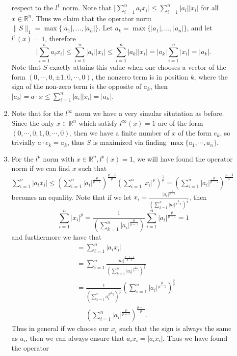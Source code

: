 \documentclass[12pt, letterpaper]{article}
\newcommand{\R}{\mathbb{R}}
\begin{document}
\begin{enumerate}
\begin{enumerate}
		respect to the $l^1$ norm.  Note that 
		$\lvert \sum_{i=1}^n a_i x_i \rvert \leq 
		\sum_{i=1}^n |a_i| |x_i|$ for all $x \in \R^n$.  
		Thus we claim that the operator norm $\|S \|_1 = 
		\max\{|a_1|,\ldots,|a_n| \}$.  Let $a_k = \max\{|a_1|,\ldots,|a_n| \}$, and let $l^1(x) = 1$, therefore 
		$$
		\lvert \sum_{i=1}^n a_i x_i \rvert 
		\leq \sum_{i=1}^n |a_i||x_i| 
		\leq \sum_{i=1}^n |a_k||x_i|
		= |a_k| \sum_{i=1}^n |x_i| = |a_k|.
		$$
		Note that $S$ exactly attains this value when one chooses a vector of the form 
		$(0,\cdots,0,\pm 1,0,\cdots,0)$, the nonzero term is in position     $k$, where the sign of the non-zero term is the 
		opposite of $a_k$, then 
		$|a_k| = a \cdot x \leq  \sum_{i=1}^n |a_i||x_i| = |a_k|$.  
		\item Note that for the $l^\infty$ norm we have a 
		very simular situtation as before.  Since the only 
		$x \in \R^n$ which satisfy $l^\infty(x) = 1$ are of the form 
		$(0,\cdots,0,1,0,\cdots,0)$, then we have a finite number 
		of $x$ of the form $e_k$, so trivially $a\cdot e_k = a_k$, 
		thus $S$ is maximized via finding $\max \{a_1,\cdots,a_n\}$.  
		\item For the $l^p$ norm with 
		$x \in \R^n, l^p(x) = 1$, we will have found the operator 
		norm if we can find $x$ such that 
		$\sum_{i=1}^n |a_i x_i| \leq \left(\sum_{i=1}^n |a_i|^{\frac{p}{p-1}} \right)^{\frac{p-1}{p}} \left(\sum_{i=1}^n |x_i|^p \right)^\frac{1}{p} = \left(\sum_{i=1}^n |a_i|^{\frac{p}{p-1}} \right)^{\frac{p-1}{p}} $ becomes an equality.  
		Note that if we let 
		$x_i = \frac{|a_i|^{\frac{1}{p-1}}}
		{\left(\sum_{k=1}^n |a_i|^{\frac{p}{p-1}}\right)^{\frac{1}{p}}}$,
		then 
		$$
		\sum_{i=1}^n |x_i|^p = \frac{1}{\left(\sum_{k=1}^n |a_i|^{\frac{p}{p-1}}\right)}\sum_{i=1}^n |a_i|^{\frac{p}{p-1}} = 1
		$$
		and furthermore we have that 
		\begin{align*}
			&= \sum_{i=1}^n |a_i x_i| \\
			&= \sum_{i=1}^n \frac{|a_i|^\frac{p - 1 + 1}{p-1}}{\left(\sum_{k=1}^n |a_i|^{\frac{p}{p-1}}\right)^{\frac{1}{p}}}\\
			&= \frac{1}{\left(\sum_{k=1}^n a_i^{\frac{p}{p-1}}\right)^{\frac{1}{p}}} \left(\sum_{i=1}^n |a_i|^{\frac{p}{p-1}}\right)^{\frac{p}{p}}\\
			&= \left(\sum_{i=1}^n |a_i|^{\frac{p}{p-1}} \right)^{\frac{p-1}{p}}. 
		\end{align*}
		Thus in general if we choose our $x_i$ such that the sign 
		is always the same as $a_i$, then we can always ensure that 
		$a_i x_i = |a_i x_i|$.  Thus we have found the operator 

\end{enumerate}
\end{enumerate}
\end{document}
